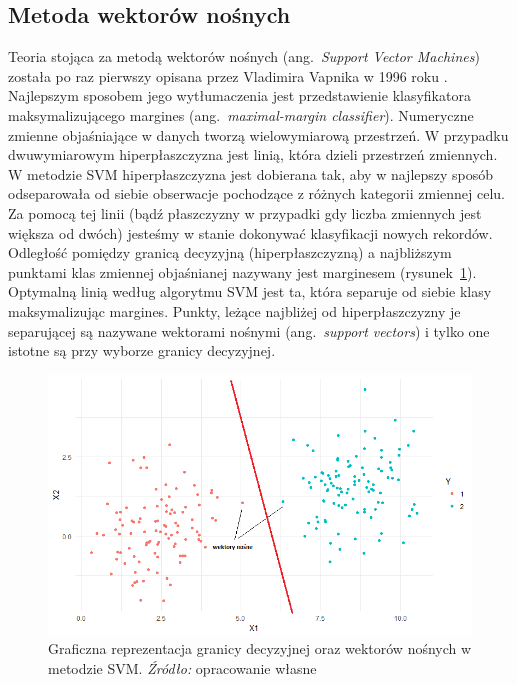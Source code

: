 \documentclass[12pt,a4paper,twoside,openany]{book}
\begin{document}
\subsection{Metoda wektorów nośnych}

Teoria stojąca za metodą wektorów nośnych (ang.~\textit{Support Vector Machines}) została po raz pierwszy opisana przez Vladimira Vapnika w 1996 roku \citep{vapnik1996}. Najlepszym sposobem jego wytłumaczenia jest przedstawienie klasyfikatora maksymalizującego margines (ang.~\textit{maximal-margin classifier}). Numeryczne zmienne objaśniające w danych tworzą wielowymiarową przestrzeń. W przypadku dwuwymiarowym hiperpłaszczyzna jest linią, która dzieli przestrzeń zmiennych. W metodzie SVM hiperpłaszczyzna jest dobierana tak, aby w najlepszy sposób odseparowała od siebie obserwacje pochodzące z różnych kategorii zmiennej celu. Za pomocą tej linii (bądź płaszczyzny w przypadki gdy liczba zmiennych jest większa od dwóch) jesteśmy w stanie dokonywać klasyfikacji nowych rekordów. Odległość pomiędzy granicą decyzyjną (hiperpłaszczyzną) a najbliższym punktami klas zmiennej objaśnianej nazywany jest marginesem (rysunek~\ref{rys003}). Optymalną linią według algorytmu SVM jest ta, która separuje od siebie klasy maksymalizując margines. Punkty, leżące najbliżej od hiperpłaszczyzny je separującej są nazywane wektorami nośnymi (ang.~\textit{support vectors}) i tylko one istotne są przy wyborze granicy decyzyjnej.

\begin{figure}
\centering
\includegraphics[scale=0.82]{./rys003}
\caption{Graficzna reprezentacja granicy decyzyjnej oraz wektorów nośnych w metodzie SVM. \textit{Źródło:} opracowanie własne}\label{rys003}
\end{figure}
\end{document}
